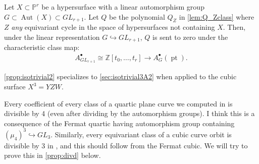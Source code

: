 \documentclass[12pt,reqno]{amsart}
\renewcommand{\to}{{\longrightarrow}}
\numberwithin{equation}{section}
\begin{document}
\begin{proposition}
\label{prop:isotrivial2}
Let $X\subset \mathbb{P}^r$ be a hypersurface with a linear automorphism group $G\subset \operatorname{Aut}(X)\subset GL_{r+1}$. Let $Q$ be the polynomial $Q_Z$ in \autoref{lem:Q_Zclass} where $Z$ \emph{any} equivariant cycle in the space of hypersurfaces not containing $X$. Then, under the linear representation $G\hookrightarrow GL_{r+1}$, $Q$ is sent to zero under the characteristic class map:
\begin{align*}
    A^{\bullet}_{GL_{r+1}}\cong \mathbb{Z}[t_0,\ldots,t_{r}]\to A^{\bullet}_{G}(\operatorname{pt}). 
\end{align*}
\end{proposition}



\begin{example}
\autoref{prop:isotrivial2} specializes to \autoref{sec:isotrivial3A2} when applied to the cubic surface $X^3=YZW$.
\end{example}

\begin{example}
Every coefficient of every class of a quartic plane curve we computed in \cite{LPT19} is divisible by 4 (even after dividing by the automorphism groups). I think this is a consequence of the Fermat quartic having automorphism group containing $(\mu_4)^3\hookrightarrow GL_3$. Similarly, every equivariant class of a cubic curve orbit is divisible by 3 in \cite[Appendix C]{LPT19}, and this should follow from the Fermat cubic. We will try to prove this in \autoref{prop:divd} below.
\end{example}
\end{document}

